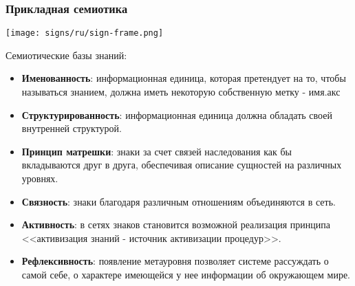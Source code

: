 \documentclass[default]{beamer}
\begin{document}
	\begin{frame}
		\frametitle{Прикладная семиотика}
		\begin{center}
			\texttt{[image: signs/ru/sign-frame.png]}
		\end{center}
		\vspace{-15pt}
		\scriptsize
		Семиотические базы знаний:
		\begin{itemize}
			\item \textbf{Именованность}: информационная единица, которая претендует на то, чтобы называться знанием, должна иметь некоторую собственную метку - имя.акс
			\item \textbf{Структурированность}: информационная единица должна обладать своей внутренней структурой.
			\item \textbf{Принцип матрешки}: знаки за счет связей наследования как бы вкладываются друг в друга, обеспечивая описание сущностей на различных уровнях.
			\item \textbf{Связность}: знаки благодаря различным отношениям объединяются в сеть.
			\item \textbf{Активность}: в сетях знаков становится возможной реализация принципа <<активизация знаний - источник активизации процедур>>.
			\item \textbf{Рефлексивность}: появление метауровня позволяет системе рассуждать о самой себе, о характере имеющейся у нее информации об окружающем мире.
		\end{itemize}
		
	\end{frame}
\end{document}
